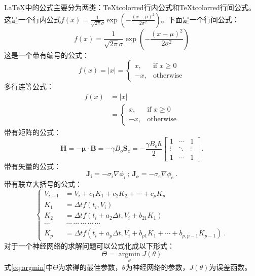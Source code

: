 \documentclass[UTF8, fontset=windows]{ctexart}
\numberwithin{equation}{section} %
\numberwithin{table}{section} %
\newcommand{\argmin}{\mathop{\mathrm{argmin}}\limits}
\newcommand{\red}[1]{{\TeX tcolor{red}{#1}}}%
\begin{document}
\LaTeX  中的公式主要分为两类：\red{行内公式}和\red{行间公式}。
这是一个行内公式$f(x) = \frac{1}{\sqrt{2\pi}\sigma}\exp{(-\frac{(x-\mu)^2}{2\sigma^2})}$。下面是一个行间公式：
$$
f(x) = \frac{1}{\sqrt{2\pi}\sigma}\exp{(-\frac{(x-\mu)^2}{2\sigma^2})}
$$
这是一个带有编号的公式：
\begin{equation}
f(x)= |x| = 
\begin{cases}
x,& \text{if } x\geq 0\\
-x,              & \text{otherwise}
\end{cases}
\label{eq:cases}
\end{equation}
多行连等公式：
\begin{equation}
\begin{split}
f(x) &= |x| \\
&= \begin{cases}
x,& \text{if } x\geq 0\\
-x,              & \text{otherwise}
\end{cases}
\end{split}
\end{equation}
带有矩阵的公式：
\begin{equation}
\mathbf{H} = -\mathbf\mu \cdot \mathbf{B} = -\gamma B_o \mathbf{S}_z = -\frac{\gamma B_o\hbar}{2} 
\begin{bmatrix}
1& \cdots &1\\ 
\vdots & \ddots & \vdots \\
1 & \cdots & 1 
\end{bmatrix}.
\label{eq:matrix}
\end{equation}
带有矢量的公式：%
\begin{equation}
\label{eq:current_density_inandout}
\bm{J_i} = -\sigma_i \nabla \phi_i ~;~ \bm{J_e}= -\sigma_e \nabla \phi_e ~.
\end{equation}
带有联立大括号的公式：%
\begin{equation}
\label{eq:runge_p_eq}
\left\lbrace
\begin{aligned}
V_{i+1} &= V_i + c_1 K_1 + c_2 K_2 + \cdots + c_p K_p \\
K_1 &= \Delta t f(t_i ,V_i) \\
K_2 &= \Delta t f\left(t_i + a_2 \Delta t, V_i + b_{21} K_1\right) \\
\cdots&~\cdots~\cdots~\cdots~\cdots~\cdots \\
K_p &= \Delta t f\left( t_i + a_p \Delta t, V_i + b_{p1} K_1 + \cdots + b_{p,p-1} K_{p-1}\right) ~.
\end{aligned}
\right.
\end{equation}
对于一个神经网络的求解问题可以公式化成以下形式：
\begin{equation}
\Theta = \argmin_{\theta} J(\theta)
\label{eq:argmin}
\end{equation}
式\ref{eq:argmin}中$\Theta$为求得的最佳参数，$\theta$为神经网络的参数，$J(\theta)$为误差函数。
\end{document}
